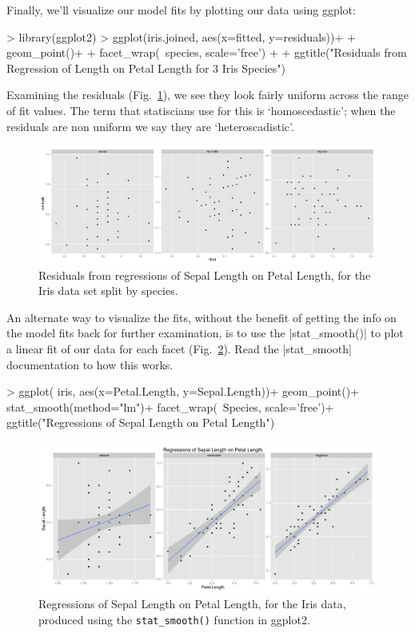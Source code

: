 Finally, we'll visualize our model fits by plotting our data using ggplot:
%
\begin{R}
> library(ggplot2)
> ggplot(iris.joined, aes(x=fitted, y=residuals))+
+   geom_point()+
+   facet_wrap(~species, scale='free') + 
+   ggtitle("Residuals from Regression of \nSepal Length on Petal Length for 3 Iris Species")
\end{R}
Examining the residuals (Fig.~\ref{fig:irissplit}), we see they look fairly uniform across the range of fit values. The term that statiscians use for this is `homoscedastic'; when the residuals are non uniform we say they are `heteroscadistic'.
%
\begin{figure}[htbp]
\centering
\includegraphics[width=0.75\columnwidth]{./figures/hands-on4/iris-residuals.pdf}
\caption{Residuals from regressions of Sepal Length on Petal Length, for the Iris data set split by species.\label{fig:irissplit}}
\end{figure}


An alternate way to visualize the fits, without the benefit of  getting the info on the model fits back for further examination, is to use the |stat_smooth()| to plot a linear fit of our data for each facet (Fig.~\ref{fig:irisregressions}). Read the |stat_smooth| documentation to how this works.
%
\begin{R}
> ggplot( iris, aes(x=Petal.Length, y=Sepal.Length))+
   geom_point()+
   stat_smooth(method="lm")+
   facet_wrap(~Species, scale='free')+
   ggtitle("Regressions of Sepal Length on Petal Length")
\end{R}
%
\begin{figure}[htbp]
\centering
\includegraphics[width=0.75\columnwidth]{./figures/hands-on4/iris-regressions.pdf}
\caption{Regressions of Sepal Length on Petal Length, for the Iris data, produced using the \lstinline|stat_smooth()| function in ggplot2.\label{fig:irisregressions}}
\end{figure}
%
